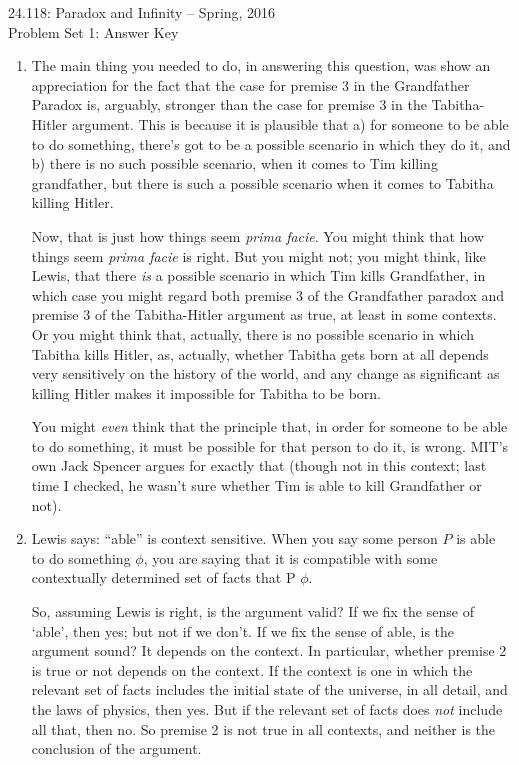\documentclass[12pt,a4paper]{article}
\begin{document}
\begin{center} {\large 24.118: Paradox and Infinity -- Spring, 2016\\ \vspace{1mm}}
 {\large Problem Set 1: Answer Key\\ \vspace{1mm}}
 \end{center}
 
 \begin{enumerate}
 
 \item The main thing you needed to do, in answering this question, was show an appreciation for the fact that the case for premise 3 in the Grandfather Paradox is, arguably, stronger than the case for premise 3 in the Tabitha-Hitler argument. This is because it is plausible that a) for someone to be able to do something, there's got to be a possible scenario in which they do it, and b) there is no such possible scenario, when it comes to Tim killing grandfather, but there is such a possible scenario when it comes to Tabitha killing Hitler.
 
Now, that is just how things seem \textsl{prima facie}. You might think that how things seem \textsl{prima facie} is right. But you might not; you might think, like Lewis, that there \emph{is} a possible scenario in which Tim kills Grandfather, in which case you might regard both premise 3 of the Grandfather paradox and premise 3 of the Tabitha-Hitler argument as true, at least in some contexts. Or you might think that, actually, there is no possible scenario in which Tabitha kills Hitler, as, actually, whether Tabitha gets born at all depends very sensitively on the history of the world, and any change as significant as killing Hitler makes it impossible for Tabitha to be born.

You might \emph{even} think that the principle that, in order for someone to be able to do something, it must be possible for that person to do it, is wrong. MIT's own Jack Spencer argues for exactly that (though not in this context; last time I checked, he wasn't sure whether Tim is able to kill Grandfather or not).

\item Lewis says: ``able'' is context sensitive. When you say some person $P$ is able to do something $\phi$, you are saying that it is compatible with some contextually determined set of facts that P $\phi$.

So, assuming Lewis is right, is the argument valid? If we fix the sense of `able', then yes; but not if we don't. If we fix the sense of able, is the argument sound? It depends on the context. In particular, whether premise 2 is true or not depends on the context. If the context is one in which the relevant set of facts includes the initial state of the universe, in all detail, and the laws of physics, then yes. But if the relevant set of facts does \emph{not} include all that, then no. So premise 2 is not true in all contexts, and neither is the conclusion of the argument.


\end{enumerate}
\end{document}
